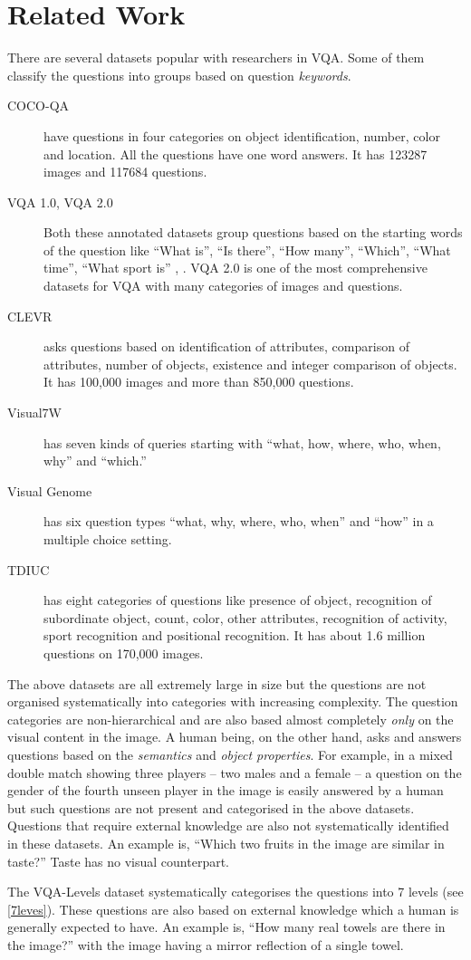 \section{Related Work}
\label{sec:relatedWork}
There are several datasets popular with researchers in VQA. Some of
them classify the questions into groups based on question
\emph{keywords}. 
\begin{description}
\item[COCO-QA]\cite{ren2015} have questions in four categories on
  object identification, number, color and location. All the questions
  have one word answers. It has 123287 images and 117684 questions.
\item[VQA 1.0, VQA 2.0]\cite{antol2015,goyal2017} Both these
  annotated datasets group questions based on the starting words of
  the question like ``What is'', ``Is there'', ``How many'',
  ``Which'', ``What time'', ``What sport is'' , \etc. VQA 2.0 is one
  of the most comprehensive datasets for VQA with many categories of
  images and questions.
\item[CLEVR]\cite{johnson2017} asks questions based on identification
  of attributes,  comparison of attributes, number of objects,
  existence and integer comparison of objects. It has 100,000 images
  and more than 850,000 questions. 
\item[Visual7W]\cite{zhu2016} has seven kinds of queries starting with
  ``what, how, where, who, when, why''  and ``which.''
\item[Visual Genome]\cite{krishna2017} has six question types ``what,
  why, where, who, when'' and ``how'' in a multiple
  choice setting.
\item[TDIUC]\cite{kafle2017} has eight categories of questions
  like presence of object, recognition of subordinate object, count,
  color, other attributes, recognition of activity, sport recognition
  and positional recognition. It has about 1.6 million questions on
  170,000 images.
\end{description}
The above datasets are all extremely large in size but the questions
are not organised systematically into categories with increasing
complexity. The question categories are non-hierarchical and are also
based almost completely \emph{only} on the visual content in the
image. A human being, on the other hand, asks and answers questions
based on the \emph{semantics} and \emph{object properties}. For
example, in a mixed double match showing three players -- two males
and a female -- a question on the gender of the fourth unseen player
in the image is easily answered by a human but such questions are not
present and categorised in the above datasets. Questions that require
external knowledge are also not systematically identified in these
datasets. An example is, ``Which two fruits in the image are similar
in taste?'' Taste has no visual counterpart.

The VQA-Levels dataset systematically categorises the questions into 7
levels (see \cref{7leves}). These questions are also based on
external knowledge which a human is generally expected to have. An
example is, ``How many real towels are there in the image?'' with the
image having a mirror reflection of a single towel.